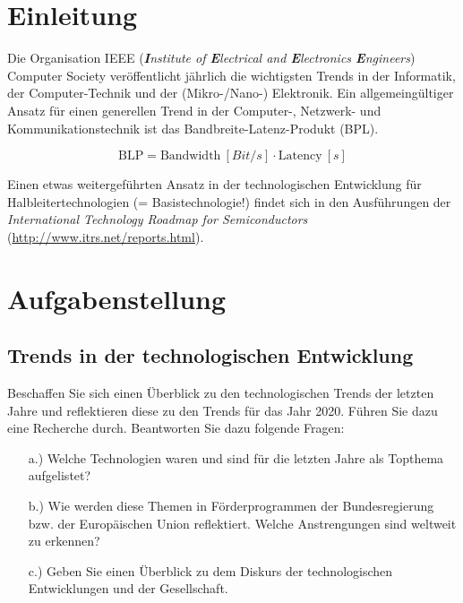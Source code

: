 \documentclass[addpoints,11pt]{exam}
\begin{document}
\addtocounter{page}{1}
\renewcommand{\baselinestretch}{1.5}
\setlength{\bigskipamount}{20pt}

\section{Einleitung}  

Die Organisation IEEE (\textit{\textbf{I}nstitute of \textbf{E}lectrical and \textbf{E}lectronics \textbf{E}ngineers}) Computer Society veröffentlicht jährlich die wichtigsten Trends in der Informatik, der Computer-Technik und der (Mikro-/Nano-) Elektronik. Ein allgemeingültiger Ansatz für einen generellen Trend in der Computer-, Netzwerk- und Kommunikationstechnik ist das Bandbreite-Latenz-Produkt (BPL).

\begin{equation*}
\text{BLP} = \text{Bandwidth} ~[Bit/s] \cdot \text{Latency} ~[s]
\end{equation*}

Einen etwas weitergeführten Ansatz in der technologischen Entwicklung für Halbleitertechnologien (= Basistechnologie!) findet sich in den Ausführungen der \textit{International Technology Roadmap for Semiconductors} (\url{http://www.itrs.net/reports.html}).
\section{Aufgabenstellung}

\subsection{Trends in der technologischen Entwicklung}

Beschaffen Sie sich einen Überblick zu den technologischen Trends der letzten Jahre und reflektieren diese zu den Trends für das Jahr 2020. Führen Sie dazu eine Recherche durch. Beantworten Sie dazu folgende Fragen:

\begin{itemize}
		\item[a.)] Welche Technologien waren und sind für die letzten Jahre als Topthema aufgelistet?
		 \item[b.)] Wie werden diese Themen in Förderprogrammen der Bundesregierung bzw. der Europäischen Union reflektiert. Welche Anstrengungen sind weltweit zu erkennen?
		\item[c.)] Geben Sie einen Überblick zu dem Diskurs der technologischen Entwicklungen und der Gesellschaft. 
\end{itemize}
\end{document}

